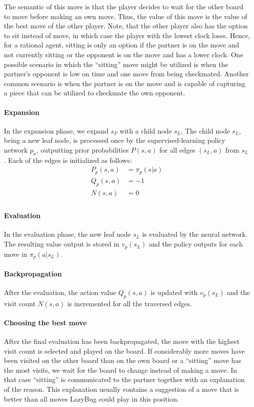 The semantic of this move is that the player decides to wait for the other board to move before making an own move.
Thus, the value of this move is the value of the best move of the other player.
Note, that the other player also has the option to sit instead of move, in which case the player with the lowest clock loses.
Hence, for a rational agent, sitting is only an option if the partner is on the move and not currently sitting or the opponent is on the move and has a lower clock.
One possible scenario in which the ``sitting'' move might be utilized is when the partner's opponent is low on time and one move from being checkmated.
Another common scenario is when the partner is on the move and is capable of capturing a piece that can be utilized to checkmate the own opponent.

\paragraph{Expansion}
In the expansion phase, we expand $s_P$ with a child node $s_L$.
The child node $s_{L}$, being a new leaf node, is processed once by the supervised-learning policy network $p_{\sigma}$, outputting prior probabilities $P(s,a)$ for all edges $(s_L,a)$ from $s_{L}$.
Each of the edges is initialized as follows:
\begin{align*}
    P_p(s,a) &= \pi_p(s|a)\\
    Q_p(s,a) &= -1\\
    N(s,a) &= 0\\
\end{align*}

\paragraph{Evaluation}
In the evaluation phase, the new leaf node $s_{L}$ is evaluated by the neural network.
The resulting value output is stored in $v_p (s_{L})$ and the policy outputs for each move in $\pi_p(a|s_L)$.

\paragraph{Backpropagation}
After the evaluation, the action value $Q_p(s,a)$ is updated with $v_p(s_{L})$ and the visit count $N(s,a)$ is incremented for all the traversed edges.

\paragraph{Choosing the best move}
After the final evaluation has been backpropagated, the move with the highest visit count is selected and played on the board.
If considerably more moves have been visited on the other board than on the own board or a ``sitting'' move has the most visits, we wait for the board to change instead of making a move.
In that case ``sitting'' is communicated to the partner together with an explanation of the reason.
This explanation usually contains a suggestion of a move that is better than all moves LazyBug could play in this position.
